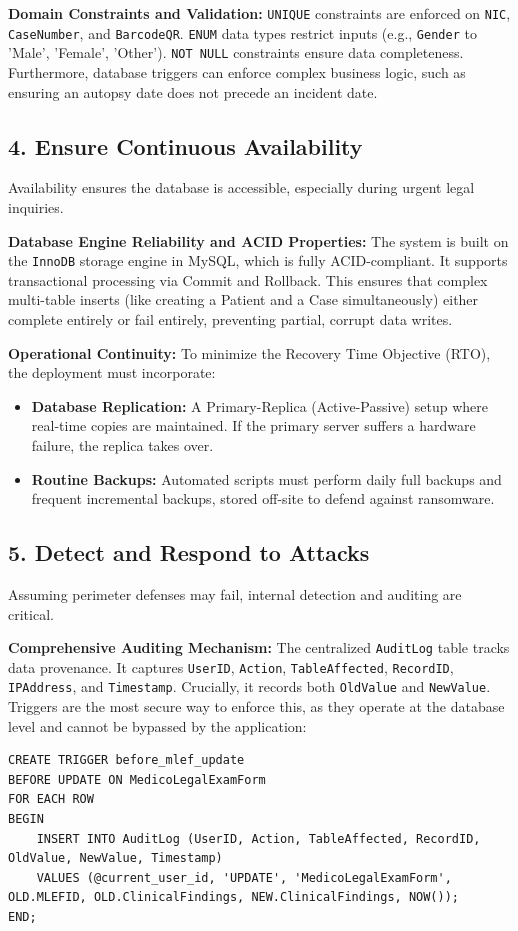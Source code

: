 \documentclass[12pt,a4paper]{article}
\begin{document}
\textbf{Domain Constraints and Validation:}
\texttt{UNIQUE} constraints are enforced on \texttt{NIC}, \texttt{CaseNumber}, and \texttt{BarcodeQR}. \texttt{ENUM} data types restrict inputs (e.g., \texttt{Gender} to 'Male', 'Female', 'Other'). \texttt{NOT NULL} constraints ensure data completeness. Furthermore, database triggers can enforce complex business logic, such as ensuring an autopsy date does not precede an incident date.

\subsection{4. Ensure Continuous Availability}
Availability ensures the database is accessible, especially during urgent legal inquiries.

\textbf{Database Engine Reliability and ACID Properties:}
The system is built on the \texttt{InnoDB} storage engine in MySQL, which is fully ACID-compliant. It supports transactional processing via Commit and Rollback. This ensures that complex multi-table inserts (like creating a Patient and a Case simultaneously) either complete entirely or fail entirely, preventing partial, corrupt data writes.

\textbf{Operational Continuity:}
To minimize the Recovery Time Objective (RTO), the deployment must incorporate:
\begin{itemize}
    \item \textbf{Database Replication:} A Primary-Replica (Active-Passive) setup where real-time copies are maintained. If the primary server suffers a hardware failure, the replica takes over.
    \item \textbf{Routine Backups:} Automated scripts must perform daily full backups and frequent incremental backups, stored off-site to defend against ransomware.
\end{itemize}

\subsection{5. Detect and Respond to Attacks}
Assuming perimeter defenses may fail, internal detection and auditing are critical.

\textbf{Comprehensive Auditing Mechanism:}
The centralized \texttt{AuditLog} table tracks data provenance. It captures \texttt{UserID}, \texttt{Action}, \texttt{TableAffected}, \texttt{RecordID}, \texttt{IPAddress}, and \texttt{Timestamp}. Crucially, it records both \texttt{OldValue} and \texttt{NewValue}.
Triggers are the most secure way to enforce this, as they operate at the database level and cannot be bypassed by the application:
\begin{lstlisting}[caption={Hypothetical Trigger for Auditing MLEF Changes}]
CREATE TRIGGER before_mlef_update
BEFORE UPDATE ON MedicoLegalExamForm
FOR EACH ROW
BEGIN
    INSERT INTO AuditLog (UserID, Action, TableAffected, RecordID, OldValue, NewValue, Timestamp)
    VALUES (@current_user_id, 'UPDATE', 'MedicoLegalExamForm', OLD.MLEFID, OLD.ClinicalFindings, NEW.ClinicalFindings, NOW());
END;
\end{lstlisting}
\end{document}

